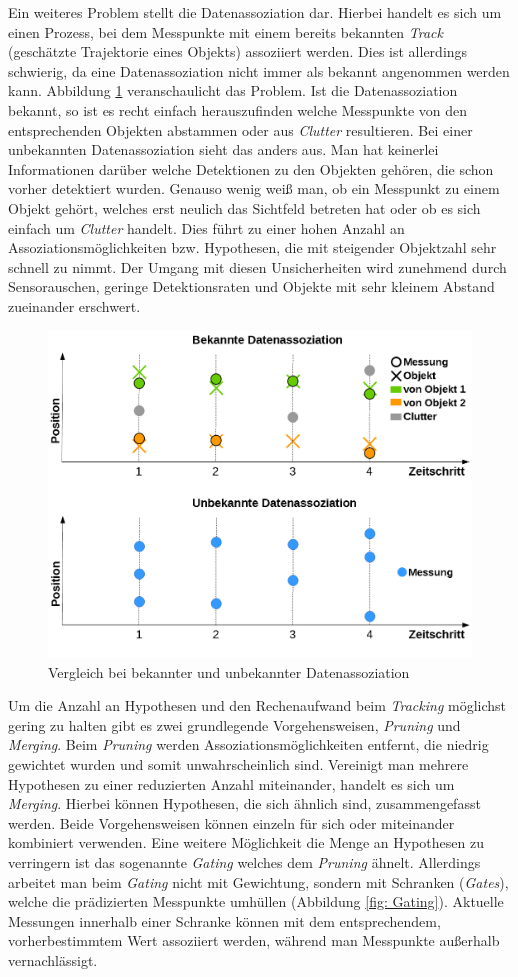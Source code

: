 \documentclass[10pt,a4paper]{article}
\begin{document}
	Ein weiteres Problem stellt die Datenassoziation dar. Hierbei handelt es sich um einen Prozess, bei dem Messpunkte mit einem bereits bekannten \textit{Track} (geschätzte Trajektorie eines Objekts) assoziiert werden. Dies ist allerdings schwierig, da eine Datenassoziation nicht immer als bekannt angenommen werden kann. Abbildung \ref{fig: Vergleich bei bekannter und unbekannter Datenassoziation} veranschaulicht das Problem. Ist die Datenassoziation bekannt, so ist es recht einfach herauszufinden welche Messpunkte von den entsprechenden Objekten abstammen oder aus \textit{Clutter} resultieren. Bei einer unbekannten Datenassoziation sieht das anders aus. Man hat keinerlei Informationen darüber welche Detektionen zu den Objekten gehören, die schon vorher detektiert wurden. Genauso wenig weiß man, ob ein Messpunkt zu einem Objekt gehört, welches erst neulich das Sichtfeld betreten hat oder ob es sich einfach um \textit{Clutter} handelt. Dies führt zu einer hohen Anzahl an Assoziationsmöglichkeiten bzw. Hypothesen, die mit steigender Objektzahl sehr schnell zu nimmt. Der Umgang mit diesen Unsicherheiten wird zunehmend durch Sensorauschen, geringe Detektionsraten und Objekte mit sehr kleinem Abstand zueinander erschwert.
	\begin{figure}[h]
		\centering
		\includegraphics[width=0.5\linewidth]{./Pictures_report/Vergleich bei bekannter und unbekannter Datenassoziation.png}
		\caption{Vergleich bei bekannter und unbekannter Datenassoziation}
		\label{fig: Vergleich bei bekannter und unbekannter Datenassoziation}
	\end{figure}
	\newline
	Um die Anzahl an Hypothesen und den Rechenaufwand beim \textit{Tracking} möglichst gering zu halten gibt es zwei grundlegende Vorgehensweisen, \textit{Pruning} und \textit{Merging}. Beim \textit{Pruning} werden Assoziationsmöglichkeiten entfernt, die niedrig gewichtet wurden und somit unwahrscheinlich sind. Vereinigt man mehrere Hypothesen zu einer reduzierten Anzahl miteinander, handelt es sich um \textit{Merging}. Hierbei können Hypothesen, die sich ähnlich sind, zusammengefasst werden. Beide Vorgehensweisen können einzeln für sich oder miteinander kombiniert verwenden. Eine weitere Möglichkeit die Menge an Hypothesen zu verringern ist das sogenannte \textit{Gating} welches dem \textit{Pruning} ähnelt. Allerdings arbeitet man beim \textit{Gating} nicht mit Gewichtung, sondern mit Schranken (\textit{Gates}), welche die prädizierten Messpunkte umhüllen (Abbildung \ref{fig: Gating}). Aktuelle Messungen innerhalb einer Schranke können mit dem entsprechendem, vorherbestimmtem Wert assoziiert werden, während man Messpunkte außerhalb vernachlässigt.
\end{document}
